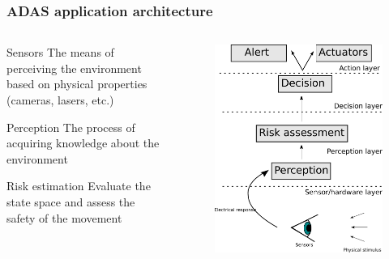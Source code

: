 \documentclass{beamer}
\begin{document}
	\begin{frame}
		\frametitle{ADAS application architecture}	
		
		\begin{columns}[t]
		  \begin{column}{6cm}

			\begin{block}{Sensors}
					The means of perceiving the environment based on physical properties (cameras, lasers, etc.)
			\end{block}		

			\begin{block}{Perception}
					The process of acquiring knowledge about the environment \cite{iyengar1991autonomous}
			\end{block}		

			\begin{block}{Risk estimation}
					Evaluate the state space and assess the safety of the movement
			\end{block}				  

		  
		  \end{column}
		  
		  \begin{column}{6cm}
			\begin{figure}[h]
				\center
				\includegraphics[scale=0.23]{../img/fig:sensors:roles}
			\end{figure}
		  \end{column}
		 \end{columns}		
		


\end{frame}
\end{document}
